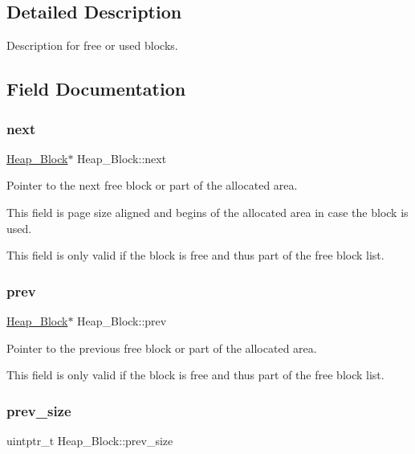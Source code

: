 \subsection{Detailed Description}
Description for free or used blocks. 

\subsection{Field Documentation}
\mbox{\label{structHeap__Block_aec0a85358dfd11d8b7a3878d30977d6d}} 
\subsubsection{\texorpdfstring{next}{next}}
{\footnotesize\ttfamily \mbox{\hyperlink{structHeap__Block}{Heap\+\_\+\+Block}}$\ast$ Heap\+\_\+\+Block\+::next}



Pointer to the next free block or part of the allocated area. 

This field is page size aligned and begins of the allocated area in case the block is used.

This field is only valid if the block is free and thus part of the free block list. \mbox{\label{structHeap__Block_a76e15fe01db6f3e3e7f206a744280828}} 
\subsubsection{\texorpdfstring{prev}{prev}}
{\footnotesize\ttfamily \mbox{\hyperlink{structHeap__Block}{Heap\+\_\+\+Block}}$\ast$ Heap\+\_\+\+Block\+::prev}



Pointer to the previous free block or part of the allocated area. 

This field is only valid if the block is free and thus part of the free block list. \mbox{\label{structHeap__Block_ac19e44024599b1042cc628ccfd3abf53}} 
\subsubsection{\texorpdfstring{prev\_size}{prev\_size}}
{\footnotesize\ttfamily uintptr\+\_\+t Heap\+\_\+\+Block\+::prev\+\_\+size}



